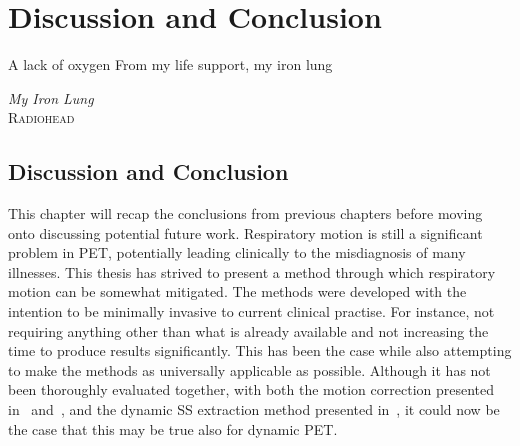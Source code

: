 \chapter{Discussion and Conclusion} \label{sec:discussion_and_conclusion}
    \vspace*{\fill}
    \setlength{\epigraphwidth}{0.4\linewidth}
    \renewcommand{\epigraphflush}{flushright}
    \renewcommand{\epigraphsize}{\footnotesize}
    \epigraph{A lack of oxygen\newline
              From my life support, my iron lung}%
              {\textit{My Iron Lung}\\ \textsc{Radiohead}}
    
    \newpage

    \section{Discussion and Conclusion} \label{sec:discussion_and_conclusion_discussion_and_conclusion}
        This chapter will recap the conclusions from previous chapters before moving onto discussing potential future work. Respiratory motion is still a significant problem in \gls{PET}, potentially leading clinically to the misdiagnosis of many illnesses. This thesis has strived to present a method through which respiratory motion can be somewhat mitigated. The methods were developed with the intention to be minimally invasive to current clinical practise. For instance, not requiring anything other than what is already available and not increasing the time to produce results significantly. This has been the case while also attempting to make the methods as universally applicable as possible. Although it has not been thoroughly evaluated together, with both the motion correction presented in~ and~, and the dynamic \gls{SS} extraction method presented in~, it could now be the case that this may be true also for dynamic \gls{PET}.

